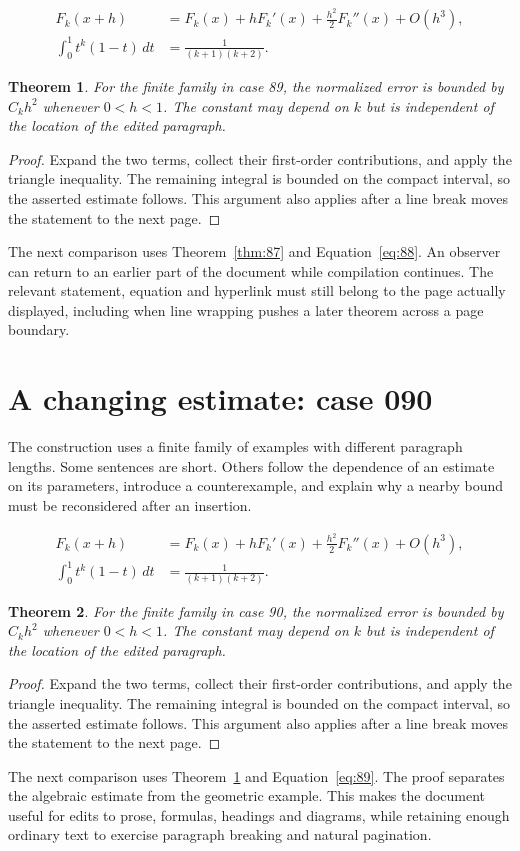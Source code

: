 \documentclass[a4paper,10pt]{article}
\newtheorem{theorem}{Theorem}[section]
\begin{document}
\lipsum[25-26]
\begin{align}\label{eq:88}
 F_k(x+h)&=F_k(x)+hF_k'(x)+\frac{h^2}{2}F_k''(x)+O(h^3),\\
 \int_0^1 t^k(1-t)\,dt&=\frac{1}{(k+1)(k+2)}.
\end{align}
\begin{theorem}\label{thm:88}
For the finite family in case 89, the normalized error is bounded by $C_k h^2$ whenever $0<h<1$. The constant may depend on $k$ but is independent of the location of the edited paragraph.
\end{theorem}
\begin{proof}
Expand the two terms, collect their first-order contributions, and apply the
triangle inequality. The remaining integral is bounded on the compact interval,
so the asserted estimate follows. This argument also applies after a line break
moves the statement to the next page.
\end{proof}
The next comparison uses Theorem~\ref{thm:87} and Equation~\ref{eq:88}. An observer can return to an earlier part of the document while compilation continues. The relevant statement, equation and hyperlink must still belong to the page actually displayed, including when line wrapping pushes a later theorem across a page boundary.

\lipsum[18]

\section{A changing estimate: case 090}\label{unit:89}
The construction uses a finite family of examples with different paragraph lengths. Some sentences are short. Others follow the dependence of an estimate on its parameters, introduce a counterexample, and explain why a nearby bound must be reconsidered after an insertion.

\lipsum[28-29]
\begin{align}\label{eq:89}
 F_k(x+h)&=F_k(x)+hF_k'(x)+\frac{h^2}{2}F_k''(x)+O(h^3),\\
 \int_0^1 t^k(1-t)\,dt&=\frac{1}{(k+1)(k+2)}.
\end{align}
\begin{theorem}\label{thm:89}
For the finite family in case 90, the normalized error is bounded by $C_k h^2$ whenever $0<h<1$. The constant may depend on $k$ but is independent of the location of the edited paragraph.
\end{theorem}
\begin{proof}
Expand the two terms, collect their first-order contributions, and apply the
triangle inequality. The remaining integral is bounded on the compact interval,
so the asserted estimate follows. This argument also applies after a line break
moves the statement to the next page.
\end{proof}
The next comparison uses Theorem~\ref{thm:88} and Equation~\ref{eq:89}. The proof separates the algebraic estimate from the geometric example. This makes the document useful for edits to prose, formulas, headings and diagrams, while retaining enough ordinary text to exercise paragraph breaking and natural pagination.
\end{document}
